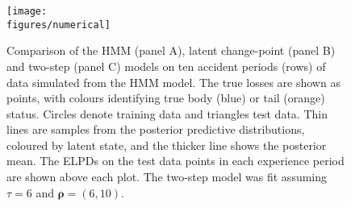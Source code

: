 \begin{figure}
    \vspace{-1.25cm}
    \centering
    \texttt{[image: \\figures/numerical]}
    \caption{
        Comparison of the HMM (panel A), 
        latent change-point (panel B)
        and two-step (panel C) models on ten accident
        periods (rows) of data simulated from
        the HMM model.
        The true losses
        are shown as points, with colours
        identifying true
        body (blue) or tail (orange) status.
        Circles denote training data and
        triangles test data. Thin 
        lines are samples from the posterior
        predictive distributions, coloured
        by latent state, and the thicker
        line shows the posterior mean.
        The ELPDs on the test data
        points in each experience period
        are shown above each plot.
        The two-step model was fit
        assuming $\tau = 6$ and
        $\bm{\rho} = (6, 10)$.
    }
	\label{fig:numerical}
\end{figure}
